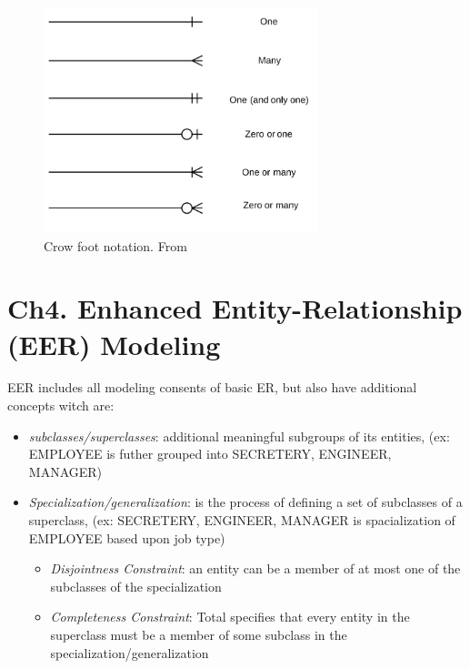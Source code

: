 \begin{multicols}{2}
\begin{figure}[H]
    \centering
    \includegraphics[width=8cm]{image/crow_foot.png}
    \caption{Crow foot notation. From \cite{dd}}
\end{figure}


\section{Ch4. Enhanced Entity-Relationship (EER) Modeling}
EER includes all modeling consents of basic ER, but also have additional concepts witch are:
\begin{itemize}
    \item \textit{subclasses/superclasses}: additional meaningful subgroups of its entities, (ex: EMPLOYEE is futher grouped into SECRETERY, ENGINEER, MANAGER)
    \item \textit{Specialization/generalization}: is the process of defining a set of subclasses of a superclass, (ex: {SECRETERY, ENGINEER, MANAGER} is spacialization of EMPLOYEE based upon job type)
    \begin{itemize}
        \item \textit{Disjointness Constraint}: an entity can be a member of at most one of the subclasses of the specialization
        \item \textit{Completeness Constraint}: Total specifies that every entity in the superclass must be a member of some subclass in the specialization/generalization
    \end{itemize}
\end{itemize} 


\end{multicols}
